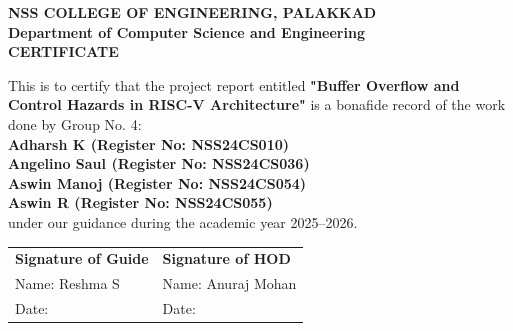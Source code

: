 \begin{center}
{\Large \bfseries NSS COLLEGE OF ENGINEERING, PALAKKAD}\\[0.5cm]
{\large \bfseries Department of Computer Science and Engineering}\\[1.5cm]
{\LARGE \bfseries CERTIFICATE}\\[1.5cm]
\end{center}
\begin{flushleft}
This is to certify that the project report entitled 
\textbf{"Buffer Overflow and Control Hazards in RISC-V Architecture"} 
is a bonafide record of the work done by Group No. 4:\\[0.5cm]

\textbf{Adharsh K \quad (Register No: NSS24CS010)}\\
\textbf{Angelino Saul \quad (Register No: NSS24CS036)}\\
\textbf{Aswin Manoj \quad (Register No: NSS24CS054)}\\
\textbf{Aswin R \quad (Register No: NSS24CS055)}\\[0.5cm]

under our guidance during the academic year 2025--2026.
\end{flushleft}

\vspace{3cm}

\noindent
\begin{tabular}{@{}p{}p{}@{}}
\textbf{Signature of Guide} & \textbf{Signature of HOD} \\
Name: Reshma S & Name: Anuraj Mohan \\
Date: & Date: \\
\end{tabular}
\thispagestyle{empty}
\newpage
